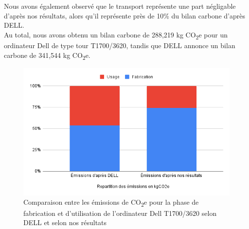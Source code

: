 \documentclass[12pt,a4paper]{paper}
\begin{document}
Nous avons également observé que le transport représente une part négligable d'après nos résultats, alors qu'il représente près de 10\% du bilan carbone d'après DELL. \\
Au total, nous avons obtenu un bilan carbone de 288,219 kg CO\textsubscript{2}e pour un ordinateur Dell de type tour T1700/3620, tandis que DELL annonce un bilan carbone de 341,544 kg CO\textsubscript{2}e.


\begin{figure}[H]%
    \centering
    \includegraphics[width=\linewidth]{img/graph-frabr-usage-dell-vs-us.png}
    \caption{Comparaison entre les émissions de CO\textsubscript{2}e pour la phase de fabrication et d'utilisation de l'ordinateur Dell T1700/3620 selon DELL et selon nos résultats}
    \label{fig:fab-impact}
\end{figure}
\end{document}
